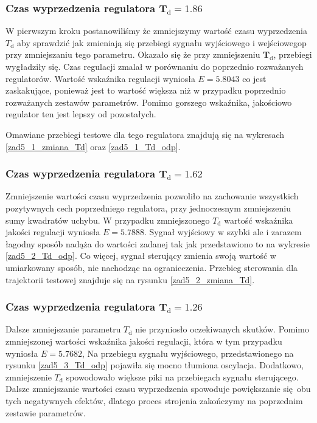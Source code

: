 \subsubsection{Czas wyprzedzenia regulatora $\mathbf{T_{\mathrm{d}}}=\num{1,86}$}
W pierwszym kroku postanowiliśmy że zmniejszymy wartość czasu wyprzedzenia $T_{\mathrm{d}}$
aby sprawdzić jak zmieniają się przebiegi sygnału wyjściowego i wejściowegop przy zmniejszaniu
tego parametru. Okazało się że przy zmniejszeniu $\mathbf{T_{\mathrm{d}}}$, przebiegi wygładziły się.
Czas regulacji zmalał w porównaniu do poprzednio rozważanych regulatorów. Wartość wskaźnika regulacji 
wyniosła $E = \num{5,8043}$ co jest zaskakujące, ponieważ jest to wartość większa niż w przypadku poprzednio
rozważanych zestawów parametrów. Pomimo gorszego wskaźnika, jakościowo regulator ten jest lepszy od pozostałych.

Omawiane przebiegi testowe dla tego regulatora znajdują się na wykresach \ref{zad5_1_zmiana_Td} oraz \ref{zad5_1_Td_odp}.

\subsubsection{Czas wyprzedzenia regulatora $\mathbf{T_{\mathrm{d}}}=\num{1,62}$}
Zmniejszenie wartości czasu wyprzedzenia pozwoliło na zachowanie wszystkich pozytywnych cech
poprzedniego regulatora, przy jednoczesnym zmniejszeniu sumy kwadratów uchybu. W przypadku zmniejszonego $T_{\mathrm{d}}$
wartość wskaźnika jakości regulacji wyniosła $E = \num{5,7888}$. Sygnał wyjściowy w szybki ale i zarazem łagodny 
sposób nadąża do wartości zadanej tak jak przedstawiono to na wykresie \ref{zad5_2_Td_odp}. Co więcej,
sygnał sterujący zmienia swoją wartość w umiarkowany sposób, nie nachodząc na ogranieczenia. Przebieg 
sterowania dla trajektorii testowej znajduje się na rysunku \ref{zad5_2_zmiana_Td}.

\subsubsection{Czas wyprzedzenia regulatora $\mathbf{T_{\mathrm{d}}}=\num{1,26}$}
Dalsze zmniejszanie parametru $T_{\mathrm{d}}$ nie przyniosło oczekiwanych skutków. Pomimo
zmniejszonej wartości wskaźnika jakości regulacji, która w tym przypadku wyniosła $E=\num{5,7682}$,
Na przebiegu sygnału wyjściowego, przedstawionego na rysunku \ref{zad5_3_Td_odp} pojawiła się mocno tłumiona
oscylacja. Dodatkowo, zmniejszenie $T_{\mathrm{d}}$ spowodowało większe piki na przebiegach 
sygnału sterującego. Dalsze zmniejszanie wartości czasu wyprzedzenia spowoduje powiększanie się obu tych negatywnych
efektów, dlatego proces strojenia zakończymy na poprzednim zestawie parametrów.

